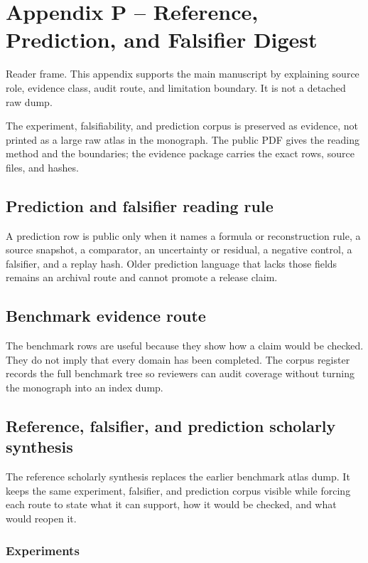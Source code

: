 \section{Appendix P -- Reference, Prediction, and Falsifier Digest}
Reader frame. This appendix supports the main manuscript by explaining source role, evidence class, audit route, and limitation boundary. It is not a detached raw dump.


\label{sec:oc-core-1-3-reference-benchmark-atlas}

The experiment, falsifiability, and prediction corpus is preserved as evidence, not printed as a large raw atlas in the monograph. The public PDF gives the reading method and the boundaries; the evidence package carries the exact rows, source files, and hashes.


\subsection{Prediction and falsifier reading rule}

A prediction row is public only when it names a formula or reconstruction rule, a source snapshot, a comparator, an uncertainty or residual, a negative control, a falsifier, and a replay hash. Older prediction language that lacks those fields remains an archival route and cannot promote a release claim.


\subsection{Benchmark evidence route}

The benchmark rows are useful because they show how a claim would be checked. They do not imply that every domain has been completed. The corpus register records the full benchmark tree so reviewers can audit coverage without turning the monograph into an index dump.


\subsection{Reference, falsifier, and prediction scholarly synthesis}

The reference scholarly synthesis replaces the earlier benchmark atlas dump. It keeps the same experiment, falsifier, and prediction corpus visible while forcing each route to state what it can support, how it would be checked, and what would reopen it.


\subsubsection{Experiments}

